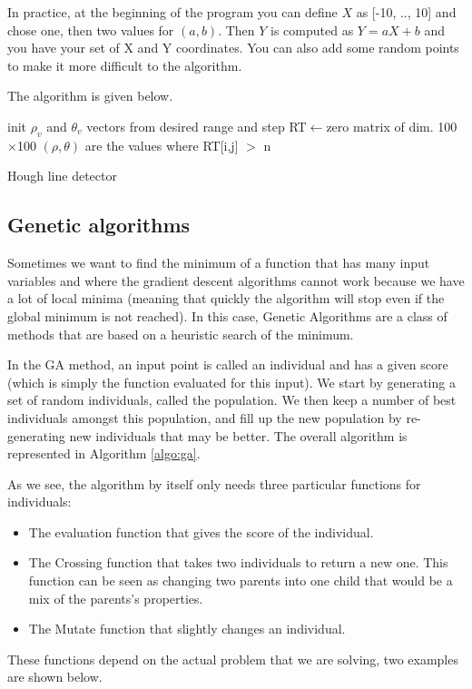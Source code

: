 \documentclass{ecnreport}
\begin{document}
 In practice, at the beginning of the program you can define $X$ as [-10, .., 10] and chose one, then two values for $(a,b)$.
 Then $Y$ is computed as $Y=aX+b$ and you have your set of X and Y coordinates. You can also add some random points to make it more difficult to the algorithm.
 
 The algorithm is given below.

 
\begin{algorithm}[!h]
{}
init $\rho_v$ and $\theta_v$ vectors from desired range and step\;
RT$\gets$zero matrix of dim. 100$\times$100\;
$(\rho,\theta)$ are the values where RT[i,j] $>$ n\;
\caption{Hough line detector}
\label{algo:hough}
\end{algorithm}

\begin{itemize}
 \end{itemize}
 
 
 
 


\subsection{Genetic algorithms}


Sometimes we want to find the minimum of a function that has many input variables and where the gradient descent algorithms cannot work because we have a lot of local minima (meaning that quickly the algorithm will stop even if the global minimum is not reached). In this case, Genetic Algorithms are a class of methods that are based on a heuristic search of the minimum. 

In the GA method, an input point is called an individual and has a given score (which is simply the function evaluated for this input). We start by generating a set of random individuals, called the population. We then keep a number of best individuals amongst this population, and fill up the new population by re-generating new individuals that may be better. The overall algorithm is represented in Algorithm \ref{algo:ga}.

As we see, the algorithm by itself only needs three particular functions for individuals:
\begin{itemize}
\item The evaluation function that gives the score of the individual.
\item The Crossing function that takes two individuals to return a new one. This function can be seen as changing two parents into one child that would be a mix of the parents's properties.
\item The Mutate function that slightly changes an individual.
\end{itemize}These functions depend on the actual problem that we are solving, two examples are shown below.
\end{document}
